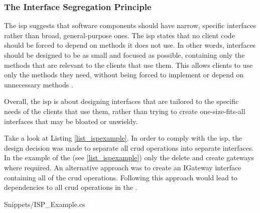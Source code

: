 \subsubsection{The Interface Segregation Principle} \label{subsubsec_isp}

The \gls{isp} suggests that software components should have narrow, specific interfaces
rather than broad, general-purpose ones. The \gls{isp} states that no client code should
be forced to depend on methods it does not use. In other words, interfaces should be
designed to be as small and focused as possible, containing only the methods that are
relevant to the clients that use them. This allows clients to use only the methods they
need, without being forced to implement or depend on unnecessary methods
\parencite[104]{robert_c_martin_clean_2018}.

Overall, the \gls{isp} is about designing interfaces that are tailored to the specific
needs of the clients that use them, rather than trying to create one-size-fits-all
interfaces that may be bloated or unwieldy.

Take a look at Listing \ref{list_ispexample}. In order to comply with the \gls{isp}, the
design decision was made to separate all \gls{crud} operations into separate interfaces.
In the example of the  (see \ref{list_ispexample})
only the delete and create gateways where required. An alternative approach was to create
an IGateway interface containing all of the \gls{crud} operations. Following this approach
would lead to dependencies to all \gls{crud} operations in the
.


    {Snippets/ISP_Example.cs}